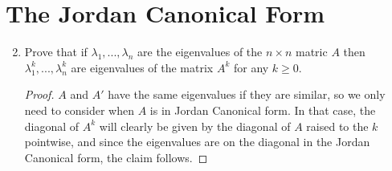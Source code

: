 \documentclass{report}
\begin{document}
\section{The Jordan Canonical Form}
\begin{enumerate} 
	\setcounter{enumi}{1}
	\item Prove that if $\lambda_1,...,\lambda_n$ are the eigenvalues of the $n\times n$ matric $A$ then $\lambda^k_1,...,\lambda^k_n$ are eigenvalues of the matrix $A^k$ for any $k\geq 0$.
		\begin{proof}
			$A$ and $A'$ have the same eigenvalues if they are similar, so we only need to consider when $A$ is in Jordan Canonical form.
			In that case, the diagonal of $A^k$ will clearly be given by the diagonal of $A$ raised to the $k$ pointwise, and since the eigenvalues are on the diagonal in the Jordan Canonical form, the claim follows.
		\end{proof}
		

\end{enumerate}
\end{document}
